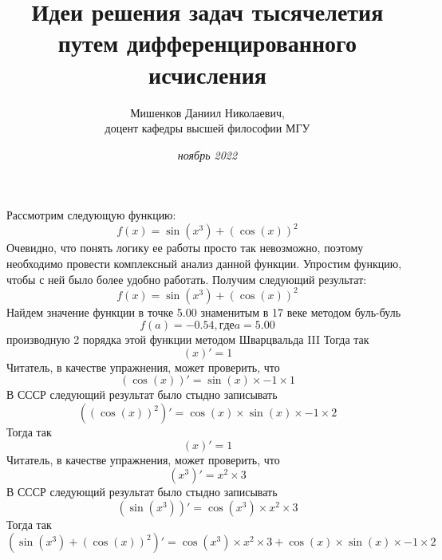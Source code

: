 \documentclass{article}
\title{\textbf {Идеи решения задач тысячелетия путем дифференцированного исчисления}}
\author{Мишенков Даниил Николаевич,\\
		доцент кафедры высшей философии МГУ}
\date{\textit {\normalsize {ноябрь 2022}}}
\begin{document}
\maketitle
\section {}
Рассмотрим следующую функцию:\newline
\[f(x) = \sin( x ^{ 3 })+(\cos( x ))^{ 2 }\]\newline
Очевидно, что понять логику ее работы просто так невозможно, поэтому необходимо провести комплексный анализ данной функции.\newline\newline
Упростим функцию, чтобы с ней было более удобно работать.\newline
Получим следующий результат:\newline\newline
\[f(x) = \sin( x ^{ 3 })+(\cos( x ))^{ 2 }\]\newline
Найдем значение функции в точке 5.00 знаменитым в 17 веке методом буль-буль\newline\[f(a) = -0.54, где a = 5.00\] производную 2 порядка этой функции методом Шварцвальда III\newline
Тогда так\newline
\[( x )' =  1 \]\newline
Читатель, в качестве упражнения, может проверить, что\newline
\[(\cos( x ))' = \sin( x )\times -1 \times 1 \]\newline
В СССР следующий результат было стыдно записывать\newline
\[((\cos( x ))^{ 2 })' = \cos( x )\times\sin( x )\times -1 \times 2 \]\newline
Тогда так\newline
\[( x )' =  1 \]\newline
Читатель, в качестве упражнения, может проверить, что\newline
\[( x ^{ 3 })' =  x ^{ 2 }\times 3 \]\newline
В СССР следующий результат было стыдно записывать\newline
\[(\sin( x ^{ 3 }))' = \cos( x ^{ 3 })\times x ^{ 2 }\times 3 \]\newline
Тогда так\newline
\[(\sin( x ^{ 3 })+(\cos( x ))^{ 2 })' = \cos( x ^{ 3 })\times x ^{ 2 }\times 3 +\cos( x )\times\sin( x )\times -1 \times 2 \]\newline
\end{document}
